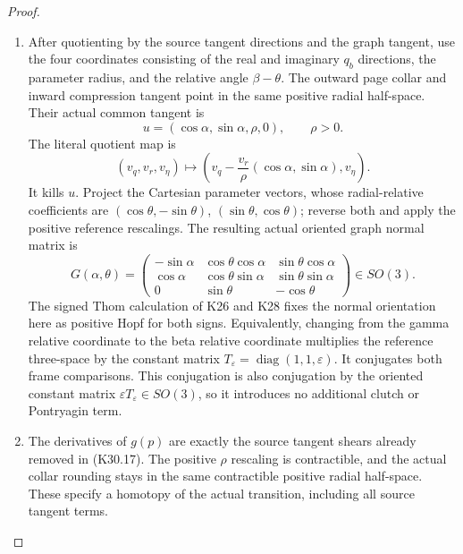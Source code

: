 \begin{proof}
\begin{enumerate}[label=\arabic*.]
\item After quotienting by the source tangent directions and
the graph tangent, use the four coordinates consisting of
the real and imaginary \(q_b\) directions, the parameter
radius, and the relative angle \(\beta-\theta\).
The outward page collar and inward compression tangent
point in the same positive radial half-space. Their actual
common tangent is
\[
           u=(\cos\alpha,\sin\alpha,\rho,0),\qquad\rho>0.
\]
The literal quotient map is
\[
 (v_q,v_r,v_\eta)\longmapsto
       \left(v_q-\frac{v_r}{\rho}(\cos\alpha,\sin\alpha),
               v_\eta\right).
 \tag{K30.17}
\]
It kills \(u\). Project the Cartesian parameter vectors,
whose radial-relative coefficients are
\((\cos\theta,-\sin\theta)\), \((\sin\theta,\cos\theta)\);
reverse both and apply the positive reference rescalings.
The resulting actual oriented graph normal matrix is
\[
 G(\alpha,\theta)=
 \begin{pmatrix}
 -\sin\alpha&\cos\theta\cos\alpha&\sin\theta\cos\alpha\\
 \cos\alpha&\cos\theta\sin\alpha&\sin\theta\sin\alpha\\
 0&\sin\theta&-\cos\theta
 \end{pmatrix}\in SO(3).
 \tag{K30.18}
\]
The signed Thom calculation of K26 and K28 fixes the normal
orientation here as positive Hopf for both signs.
Equivalently, changing from the gamma relative coordinate
to the beta relative coordinate multiplies the reference
three-space by the constant matrix
\(T_\varepsilon=\operatorname{diag}(1,1,\varepsilon)\).
It conjugates both frame comparisons. This conjugation is
also conjugation by the oriented constant matrix
\(\varepsilon T_\varepsilon\in SO(3)\), so it introduces no
additional clutch or Pontryagin term.

\item The derivatives of \(g(p)\) are exactly the source tangent
shears already removed in (K30.17). The positive \(\rho\)
rescaling is contractible, and the actual collar rounding
stays in the same contractible positive radial half-space.
These specify a homotopy of the actual transition, including
all source tangent terms.


\end{enumerate}
\end{proof}
